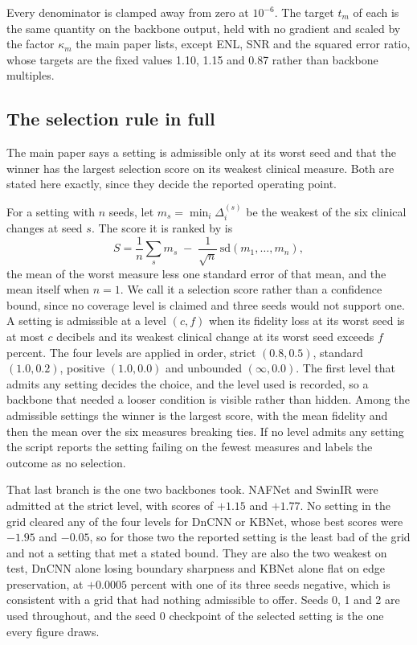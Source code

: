 Every denominator is clamped away from zero at $10^{-6}$. The target $t_m$ of each is the same
quantity on the backbone output, held with no gradient and scaled by the factor $\kappa_m$ the main
paper lists, except ENL, SNR and the squared error ratio, whose targets are the fixed values 1.10,
1.15 and 0.87 rather than backbone multiples.

\subsection{The selection rule in full}
\label{sec:supp_selection}
The main paper says a setting is admissible only at its worst seed and that the winner has the
largest selection score on its weakest clinical measure. Both are stated here exactly, since
they decide the reported operating point.

For a setting with $n$ seeds, let $m_s = \min_i \Delta_i^{(s)}$ be the weakest of the six clinical
changes at seed $s$. The score it is ranked by is
\begin{equation}
S = \frac{1}{n}\sum_s m_s \;-\; \frac{1}{\sqrt{n}}\,\mathrm{sd}(m_1,\ldots,m_n),
\end{equation}
the mean of the worst measure less one standard error of that mean, and the mean itself when
$n = 1$. We call it a selection score rather than a confidence bound, since no coverage level is
claimed and three seeds would not support one. A setting is admissible at a level $(c, f)$ when its fidelity loss at its worst seed is
at most $c$ decibels and its weakest clinical change at its worst seed exceeds $f$ percent. The four
levels are applied in order, strict $(0.8, 0.5)$, standard $(1.0, 0.2)$, positive $(1.0, 0.0)$ and
unbounded $(\infty, 0.0)$. The first level that admits any setting decides the choice, and the level
used is recorded, so a backbone that needed a looser condition is visible rather than hidden. Among
the admissible settings the winner is the largest score, with the mean fidelity and then the mean over
the six measures breaking ties. If no level admits any setting the script reports the setting failing
on the fewest measures and labels the outcome as no selection.

That last branch is the one two backbones took. NAFNet and SwinIR were admitted at the strict level,
with scores of $+1.15$ and $+1.77$. No setting in the grid cleared any of the four levels for
DnCNN or KBNet, whose best scores were $-1.95$ and $-0.05$, so for those two the reported
setting is the least bad of the grid and not a setting that met a stated bound. They are also the two weakest on test, DnCNN alone
losing boundary sharpness and KBNet alone flat on edge preservation, at $+0.0005$ percent with one of
its three seeds negative, which is consistent with a grid that had nothing admissible to offer. Seeds 0, 1 and 2 are used throughout, and the seed 0 checkpoint of the
selected setting is the one every figure draws.

